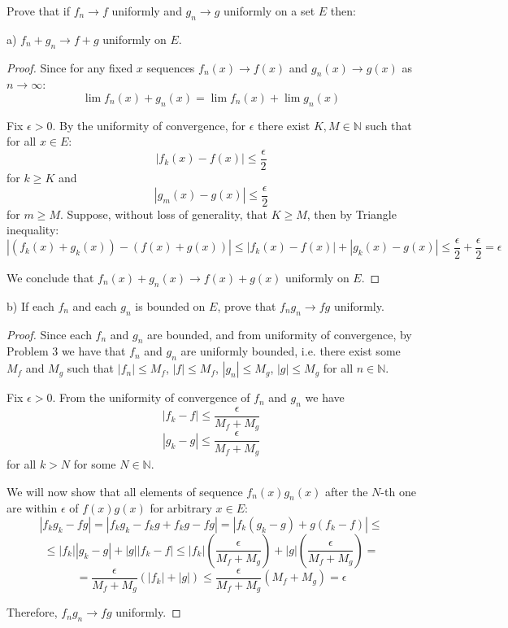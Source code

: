 \documentclass{article}
\begin{document}
\begin{tcolorbox}
Prove that if $f_n \to f$ uniformly and $g_n \to g$ uniformly on a set $E$ then:

a) $f_n + g_n \to f + g$ uniformly on $E$.
\end{tcolorbox}
\begin{proof}
Since for any fixed $x$ sequences $f_n(x) \to f(x)$ and $g_n(x) \to g(x)$ as $n \to \infty$:
$$ \lim f_n(x) + g_n(x) = \lim f_n(x) + \lim g_n(x) $$

Fix $\epsilon>0$. By the uniformity of convergence, for $\epsilon$ there exist $K, M \in \mathbb{N}$ such that for all $x \in E$:
$$ | f_k(x) - f(x) | \leq \frac{\epsilon}{2} $$
for $k \geq K$ and
$$ | g_m(x) - g(x) | \leq \frac{\epsilon}{2} $$
for $m \geq M$. 
Suppose, without loss of generality, that $K \geq M$, then by Triangle inequality:
$$ | (f_k(x) + g_k(x)) - (f(x) + g(x)) | \leq |f_k(x)-f(x)| + |g_k(x)-g(x)| \leq \frac{\epsilon}{2} + \frac{\epsilon}{2} = \epsilon $$

We conclude that $f_n(x) + g_n(x) \to f(x)+g(x)$ uniformly on $E$.
\end{proof}

\begin{tcolorbox}
b) If each $f_n$ and each $g_n$ is bounded on $E$, prove that $f_n g_n \to f g$ uniformly.
\end{tcolorbox}
\begin{proof}
Since each $f_n$ and $g_n$ are bounded, and from uniformity of convergence, by Problem 3 we have that $f_n$ and $g_n$ are uniformly bounded, i.e. there exist some $M_f$ and $M_g$ such that $|f_n| \leq M_f$, $|f| \leq M_f$, $|g_n| \leq M_g$, $|g| \leq M_g$ for all $n \in \mathbb{N}$.

Fix $\epsilon>0$. From the uniformity of convergence of $f_n$ and $g_n$ we have
$$ |f_k - f| \leq \frac{\epsilon}{M_f + M_g} $$
$$ |g_k - g| \leq \frac{\epsilon}{M_f + M_g} $$
for all $k > N$ for some $N \in \mathbb{N}$.

We will now show that all elements of sequence $f_n(x) g_n(x)$ after the $N$-th one are within $\epsilon$ of $f(x)g(x)$ for arbitrary $x \in E$:
$$ |f_k g_k - fg| = |f_k g_k - f_k g + f_k g - fg| = |f_k(g_k-g) + g(f_k-f)| \leq $$
$$ \leq |f_k| |g_k-g| + |g| |f_k-f| \leq |f_k| \left( \frac{\epsilon}{M_f + M_g} \right) + |g| \left( \frac{\epsilon}{M_f + M_g} \right) = $$
$$ = \frac{\epsilon}{M_f + M_g} (|f_k|+|g|) \leq \frac{\epsilon}{M_f + M_g} (M_f+M_g) = \epsilon $$

Therefore, $f_n g_n \to fg$ uniformly.

\end{proof}
\end{document}
